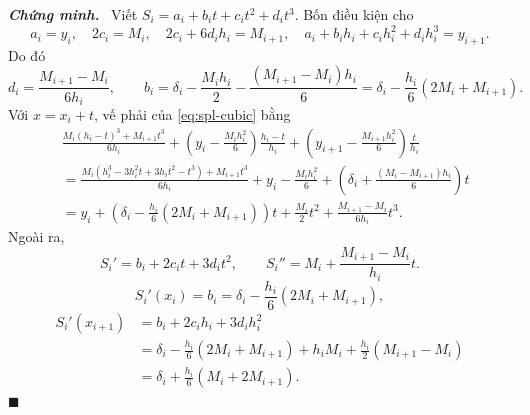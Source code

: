 \documentclass[12pt,a4paper,oneside]{book}
\numberwithin{algorithm}{chapter}
\theoremstyle{definition}
\newenvironment{chungminh}{\par\medskip\noindent\textbf{\textit{\color{mainblue}Chứng minh.}}\ }{\hfill$\blacksquare$\par\medskip}
\begin{document}
\begin{chungminh}
Viết $S_i=a_i+b_it+c_it^2+d_it^3$. Bốn điều kiện cho
\[
 a_i=y_i,\quad 2c_i=M_i,\quad 2c_i+6d_ih_i=M_{i+1},\quad
 a_i+b_ih_i+c_ih_i^2+d_ih_i^3=y_{i+1}.
\]
Do đó
\[
 d_i=\frac{M_{i+1}-M_i}{6h_i},\qquad
 b_i=\delta_i-\frac{M_ih_i}2-\frac{(M_{i+1}-M_i)h_i}6
 =\delta_i-\frac{h_i}6(2M_i+M_{i+1}).
\]
Với $x=x_i+t$, vế phải của \eqref{eq:spl-cubic} bằng
\begin{align*}
 &\frac{M_i(h_i-t)^3+M_{i+1}t^3}{6h_i}
 +\left(y_i-\frac{M_ih_i^2}6\right)\frac{h_i-t}{h_i}
 +\left(y_{i+1}-\frac{M_{i+1}h_i^2}6\right)\frac{t}{h_i}\\
 &=\frac{M_i(h_i^3-3h_i^2t+3h_it^2-t^3)+M_{i+1}t^3}{6h_i}
 +y_i-\frac{M_ih_i^2}6
 +\left(\delta_i+\frac{(M_i-M_{i+1})h_i}6\right)t\\
 &=y_i+\left(\delta_i-\frac{h_i}6(2M_i+M_{i+1})\right)t
 +\frac{M_i}2t^2+\frac{M_{i+1}-M_i}{6h_i}t^3.
\end{align*} Ngoài ra,
\[
 S_i'=b_i+2c_it+3d_it^2,\qquad
 S_i''=M_i+\frac{M_{i+1}-M_i}{h_i}t.
\]
\[
 S_i'(x_i)=b_i=\delta_i-\frac{h_i}6(2M_i+M_{i+1}),
\]
\begin{align*}
 S_i'(x_{i+1})
 &=b_i+2c_ih_i+3d_ih_i^2\\
 &=\delta_i-\frac{h_i}6(2M_i+M_{i+1})
   +h_iM_i+\frac{h_i}2(M_{i+1}-M_i)\\
 &=\delta_i+\frac{h_i}6(M_i+2M_{i+1}).
\end{align*}
\end{chungminh}
\end{document}
